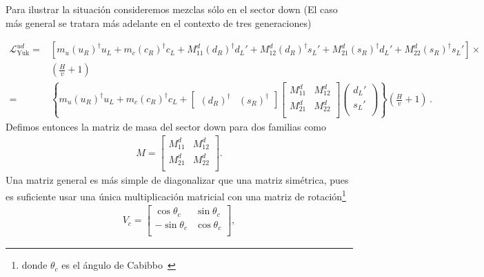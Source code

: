 Para ilustrar la situación consideremos mezclas sólo en el sector down (El caso más general se tratara más adelante en el contexto de tres generaciones)
\begin{frame}
\begin{align}
  \mathcal{L}_{\text{Yuk}}^{ud}=& \left[ m_u\left( u_R \right)^{\dagger} u_L+m_c \left( c_R \right)^{\dagger}c_L
+  M^{d}_{11}\left( d_R \right)^{\dagger} d_L'+M^d_{12}\left( d_R \right)^{\dagger}s_L' +
  M^d_{21}\left( s_R \right)^{\dagger}d_L'+M^d_{22}\left( s_R \right)^{\dagger}s_L'      \right]\times \nonumber\\
& \left( \frac{H}{v} +1\right) \nonumber\\
=&\left\{ m_u\left( u_R \right)^{\dagger} u_L+m_c \left( c_R \right)^{\dagger}c_L
+\begin{bmatrix}
     \left( d_R \right)^{\dagger} &  \left( s_R \right)^{\dagger}
   \end{bmatrix}
   \begin{bmatrix}
     M^{d}_{11} & M^{d}_{12} \\
     M^{d}_{21} & M^{d}_{22} \\                                      
  \end{bmatrix}
  \begin{pmatrix}
    d_L'\\
    s_L'\\
  \end{pmatrix}
     \right\}
   \left( \frac{H}{v} +1\right)\,.
\end{align}
Defimos entonces la matriz de masa del sector down para dos familias como
\begin{align}
  M=
  \begin{bmatrix}
     M^{d}_{11} & M^{d}_{12} \\
     M^{d}_{21} & M^{d}_{22} \\                                      
  \end{bmatrix}.
\end{align}
Una matriz general es más simple de diagonalizar que una matriz simétrica, pues es suficiente usar una única multiplicación matricial con una matriz de rotación\footnote{donde $\theta_c$ es el ángulo de Cabibbo~\cite{}}
\begin{align}
  V_c= \begin{bmatrix}
    \cos\theta_c & \sin\theta_c\\
     -\sin\theta_c & \cos\theta_c  \\
  \end{bmatrix},

\end{align}
\end{frame}
